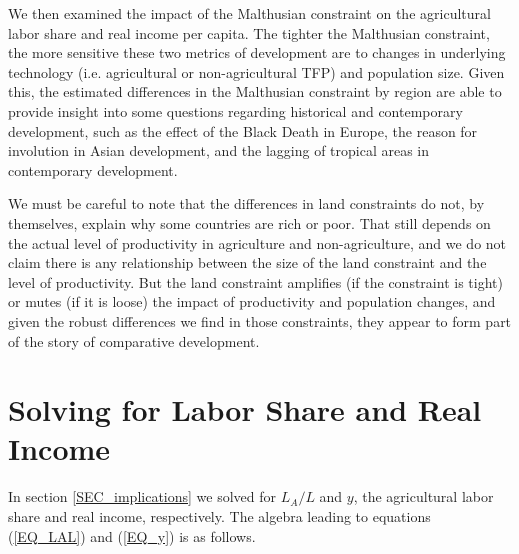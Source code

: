 \documentclass[11pt]{article}
\begin{document}
We then examined the impact of the Malthusian constraint on the agricultural labor share and real income per capita. The tighter the Malthusian constraint, the more sensitive these two metrics of development are to changes in underlying technology (i.e. agricultural or non-agricultural TFP) and population size. Given this, the estimated differences in the Malthusian constraint by region are able to provide insight into some questions regarding historical and contemporary development, such as the effect of the Black Death in Europe, the reason for involution in Asian development, and the lagging of tropical areas in contemporary development.

We must be careful to note that the differences in land constraints do not, by themselves, explain why some countries are rich or poor. That still depends on the actual level of productivity in agriculture and non-agriculture, and we do not claim there is any relationship between the size of the land constraint and the level of productivity. But the land constraint amplifies (if the constraint is tight) or mutes (if it is loose) the impact of productivity and population changes, and given the robust differences we find in those constraints, they appear to form part of the story of comparative development.

\newpage
\clearpage

\setcounter{section}{0}
\renewcommand{\thesection}{Appendix \Alph{section}}

\singlespacing

\section{Solving for Labor Share and Real Income}
In section \ref{SEC_implications} we solved for $L_A/L$ and $y$, the agricultural labor share and real income, respectively. The algebra leading to equations (\ref{EQ_LAL}) and (\ref{EQ_y}) is as follows.
\end{document}
